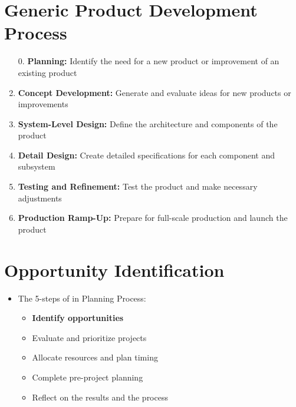 \documentclass[openany,12pt,a4paper]{book}
\begin{document}
\chapter{Generic Product Development Process}
\begin{enumerate}
    \item[0.] \textbf{Planning:} Identify the need for a new product or improvement of an existing product
    \item \textbf{Concept Development:} Generate and evaluate ideas for new products or improvements
    \item \textbf{System-Level Design:} Define the architecture and components of the product
    \item \textbf{Detail Design:} Create detailed specifications for each component and subsystem
    \item \textbf{Testing and Refinement:} Test the product and make necessary adjustments
    \item \textbf{Production Ramp-Up:} Prepare for full-scale production and launch the product
\end{enumerate}
\chapter{Opportunity Identification}
\begin{itemize}
    \item The 5-steps of in Planning Process:
    \begin{itemize}
        \item \textbf{Identify opportunities}
        \item Evaluate and prioritize projects
        \item Allocate resources and plan timing
        \item Complete pre-project planning
        \item Reflect on the results and the process
    \end{itemize}
\end{itemize}
\end{document}
